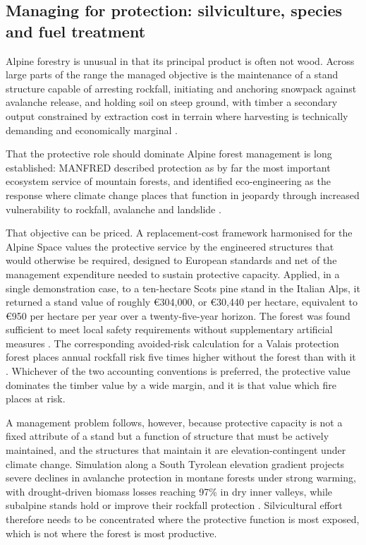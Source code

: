\documentclass[11pt,a4paper]{article}
\begin{document}
\subsection{Managing for protection: silviculture, species and fuel treatment}

Alpine forestry is unusual in that its principal product is often not wood. Across large parts of the range the managed objective is the maintenance of a stand structure capable of arresting rockfall, initiating and anchoring snowpack against avalanche release, and holding soil on steep ground, with timber a secondary output constrained by extraction cost in terrain where harvesting is technically demanding and economically marginal \citep{dinca_timber_2025}.

That the protective role should dominate Alpine forest management is long established: MANFRED described protection as by far the most important ecosystem service of mountain forests, and identified eco-engineering as the response where climate change places that function in jeopardy through increased vulnerability to rockfall, avalanche and landslide \citep{jandl_management_2013}.

That objective can be priced. A replacement-cost framework harmonised for the Alpine Space values the protective service by the engineered structures that would otherwise be required, designed to European standards and net of the management expenditure needed to sustain protective capacity. Applied, in a single demonstration case, to a ten-hectare Scots pine stand in the Italian Alps, it returned a stand value of roughly €304{,}000, or €30{,}440 per hectare, equivalent to €950 per hectare per year over a twenty-five-year horizon. The forest was found sufficient to meet local safety requirements without supplementary artificial measures \citep{accastello_asforesee_2019}. The corresponding avoided-risk calculation for a Valais protection forest places annual rockfall risk five times higher without the forest than with it \citep{moos_climate_2021}. Whichever of the two accounting conventions is preferred, the protective value dominates the timber value by a wide margin, and it is that value which fire places at risk.

A management problem follows, however, because protective capacity is not a fixed attribute of a stand but a function of structure that must be actively maintained, and the structures that maintain it are elevation-contingent under climate change. Simulation along a South Tyrolean elevation gradient projects severe declines in avalanche protection in montane forests under strong warming, with drought-driven biomass losses reaching 97\% in dry inner valleys, while subalpine stands hold or improve their rockfall protection \citep{hillebrand_contrasting_2023}. Silvicultural effort therefore needs to be concentrated where the protective function is most exposed, which is not where the forest is most productive.
\end{document}
